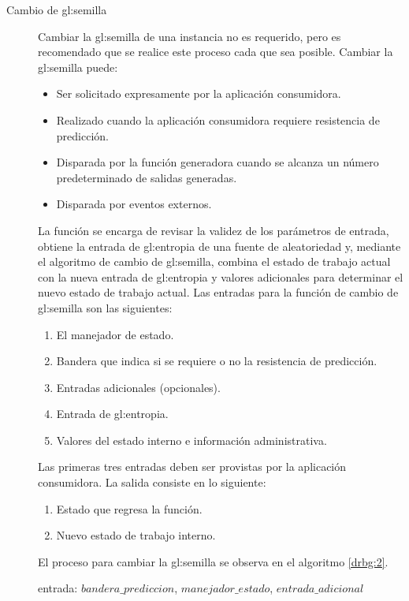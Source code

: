 \begin{description}
  \item [Cambio de \gls{gl:semilla}] Cambiar la \gls{gl:semilla} de una
    instancia no es requerido, pero es recomendado que se realice este proceso
    cada que sea posible. Cambiar la \gls{gl:semilla} puede:
    \begin{itemize}
      \item Ser solicitado expresamente por la aplicación consumidora.
      \item Realizado cuando la aplicación consumidora requiere resistencia de
        predicción.
      \item Disparada por la función generadora cuando se alcanza un número
        predeterminado de salidas generadas.
      \item Disparada por eventos externos.
    \end{itemize}
    La función se encarga de revisar la validez de los parámetros de entrada,
    obtiene la entrada de \gls{gl:entropia} de una fuente de aleatoriedad y,
    mediante el algoritmo de cambio de \gls{gl:semilla}, combina el estado de
    trabajo actual con la nueva entrada de \gls{gl:entropia} y valores
    adicionales para determinar el nuevo estado de trabajo actual. Las entradas
    para la función de cambio de \gls{gl:semilla} son las siguientes:
    \begin{enumerate}
      \item El manejador de estado.
      \item Bandera que indica si se requiere o no la resistencia de predicción.
      \item Entradas adicionales (opcionales).
      \item Entrada de \gls{gl:entropia}.
      \item Valores del estado interno e información administrativa.
    \end{enumerate}
    Las primeras tres entradas deben ser provistas por la aplicación
    consumidora. La salida consiste en lo siguiente:
    \begin{enumerate}
      \item Estado que regresa la función.
      \item Nuevo estado de trabajo interno.
    \end{enumerate}
    El proceso para cambiar la \gls{gl:semilla} se observa en el algoritmo
    \ref{drbg:2}.
    \begin{pseudocodigo}[caption={DRBG, cambio de semilla.}, label={drbg:2}]
      entrada:  $bandera\_prediccion$, $manejador\_estado$, $entrada\_adicional$

\end{pseudocodigo}
\end{description}
